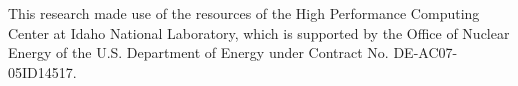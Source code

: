 This research made use of the resources of the High Performance Computing Center at Idaho National Laboratory, which is supported by the Office of Nuclear Energy of the U.S. Department of Energy under Contract No. DE-AC07-05ID14517.